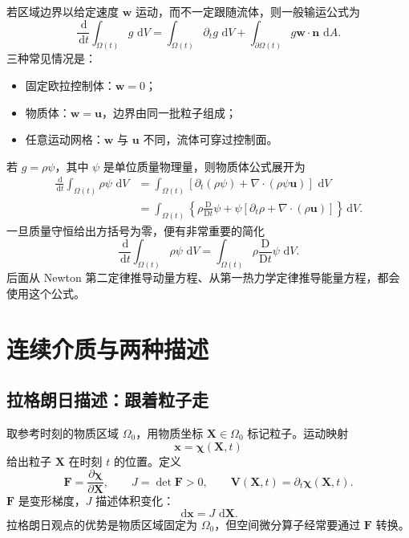 \documentclass[cn,hazy,blue,11pt,normal]{elegantnote}
\numberwithin{equation}{section}
\newcommand{\dd}{\,\mathrm d}
\newcommand{\Dt}{\frac{\mathrm D}{\mathrm Dt}}
\newcommand{\vct}[1]{\bm{#1}}
\newcommand{\ten}[1]{\bm{#1}}
\begin{document}
若区域边界以给定速度 $\vct w$ 运动，而不一定跟随流体，则一般输运公式为
\begin{equation}
 \boxed{\frac{\dd}{\dd t}\int_{\Omega(t)}g\,\dd V
 =\int_{\Omega(t)}\partial_tg\,\dd V
 +\int_{\partial\Omega(t)}g\vct w\cdot\vct n\,\dd A.} \label{eq:general-transport}
\end{equation}
三种常见情况是：
\begin{itemize}
 \item 固定欧拉控制体：$\vct w=0$；
 \item 物质体：$\vct w=\vct u$，边界由同一批粒子组成；
 \item 任意运动网格：$\vct w$ 与 $\vct u$ 不同，流体可穿过控制面。
\end{itemize}

若 $g=\rho\psi$，其中 $\psi$ 是单位质量物理量，则物质体公式展开为
\begin{align}
 \frac{\dd}{\dd t}\int_{\Omega(t)}\rho\psi\,\dd V
 &=\int_{\Omega(t)}
 [\partial_t(\rho\psi)+\nabla\cdot(\rho\psi\vct u)]\,\dd V\\
 &=\int_{\Omega(t)}\left\{
 \rho\Dt\psi
 +\psi[\partial_t\rho+\nabla\cdot(\rho\vct u)]\right\}\dd V.
\end{align}
一旦质量守恒给出方括号为零，便有非常重要的简化
\begin{equation}
 \boxed{\frac{\dd}{\dd t}\int_{\Omega(t)}\rho\psi\,\dd V
 =\int_{\Omega(t)}\rho\Dt\psi\,\dd V.} \label{eq:material-extensive}
\end{equation}
后面从 Newton 第二定律推导动量方程、从第一热力学定律推导能量方程，都会使用这个公式。

\section{连续介质与两种描述}

\subsection{拉格朗日描述：跟着粒子走}

取参考时刻的物质区域 $\Omega_0$，用物质坐标 $\vct{X}\in\Omega_0$ 标记粒子。运动映射
\begin{equation}
  \vct{x}=\vct{\chi}(\vct{X},t)
\end{equation}
给出粒子 $\vct{X}$ 在时刻 $t$ 的位置。定义
\begin{equation}
  \ten{F}=\frac{\partial\vct{\chi}}{\partial\vct{X}},
  \qquad J=\det\ten{F}>0,
  \qquad \vct{V}(\vct{X},t)=\partial_t\vct{\chi}(\vct{X},t).
\end{equation}
$\ten{F}$ 是变形梯度，$J$ 描述体积变化：
\begin{equation}
  \dd\vct{x}=J\,\dd\vct{X}.
\end{equation}
拉格朗日观点的优势是物质区域固定为 $\Omega_0$，但空间微分算子经常要通过 $\ten{F}$ 转换。
\end{document}
